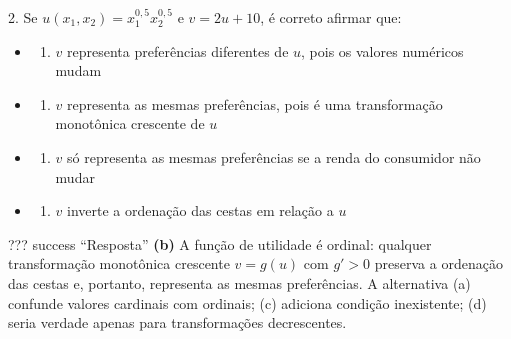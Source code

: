 \documentclass[11pt,twoside,openright]{book}
\providecommand{\tightlist}{\setlength{\itemsep}{0pt}\setlength{\parskip}{0pt}}
\begin{document}
\begin{infobox}{2. Se $u(x_1, x_2) = x_1^{0{,}5} x_2^{0{,}5}$ e $v = 2u + 10$, é correto afirmar que:}

\begin{itemize}
\tightlist
\item
  \begin{enumerate}
  \def\labelenumi{(\alph{enumi})}
  \tightlist
  \item
    \(v\) representa preferências diferentes de \(u\), pois os valores
    numéricos mudam
  \end{enumerate}
\item
  \begin{enumerate}
  \def\labelenumi{(\alph{enumi})}
  \setcounter{enumi}{1}
  \tightlist
  \item
    \(v\) representa as mesmas preferências, pois é uma transformação
    monotônica crescente de \(u\)
  \end{enumerate}
\item
  \begin{enumerate}
  \def\labelenumi{(\alph{enumi})}
  \setcounter{enumi}{2}
  \tightlist
  \item
    \(v\) só representa as mesmas preferências se a renda do consumidor
    não mudar
  \end{enumerate}
\item
  \begin{enumerate}
  \def\labelenumi{(\alph{enumi})}
  \setcounter{enumi}{3}
  \tightlist
  \item
    \(v\) inverte a ordenação das cestas em relação a \(u\)
  \end{enumerate}
\end{itemize}

??? success ``Resposta'' \textbf{(b)} A função de utilidade é ordinal:
qualquer transformação monotônica crescente \(v = g(u)\) com \(g' > 0\)
preserva a ordenação das cestas e, portanto, representa as mesmas
preferências. A alternativa (a) confunde valores cardinais com ordinais;
(c) adiciona condição inexistente; (d) seria verdade apenas para
transformações decrescentes.

\end{infobox}
\end{document}
